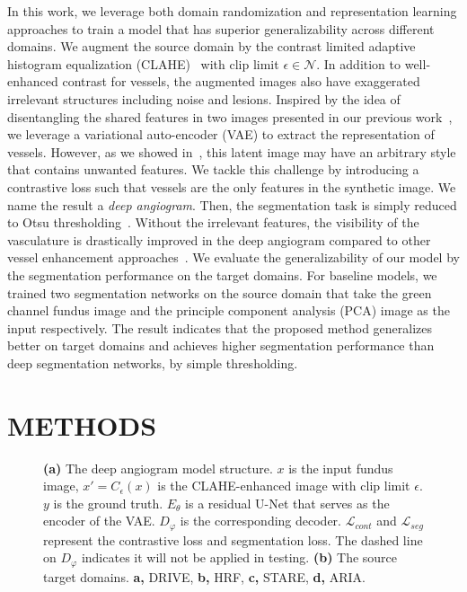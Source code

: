 \documentclass[]{spie}  %
\begin{document}
In this work, we leverage both domain randomization and representation learning approaches to train a model that has superior generalizability across different domains. We augment the source domain by the contrast limited adaptive histogram equalization (CLAHE)~\cite{reza2004realization} with clip limit $\epsilon\in \mathcal{N}$. In addition to well-enhanced contrast for vessels, the augmented images also have exaggerated irrelevant structures including noise and lesions. Inspired by the idea of disentangling the shared features in two images presented in our previous work~\cite{hu2021domain,hu2021life}, we leverage a variational auto-encoder (VAE) to extract the representation of vessels. However, as we showed in~\cite{hu2021domain}, this latent image may have an arbitrary style that contains unwanted features. We tackle this challenge by introducing a contrastive loss such that vessels are the only features in the synthetic image. We name the result a \textit{deep angiogram}. Then, the segmentation task is simply reduced to Otsu thresholding~\cite{otsu1979threshold}. Without the irrelevant features, the visibility of the vasculature is drastically improved in the deep angiogram compared to other vessel enhancement approaches~\cite{subramaniam2022vessel}. We evaluate the generalizability of our model by the segmentation performance on the target domains. For baseline models, we trained two segmentation networks on the source domain that take the green channel fundus image and the principle component analysis (PCA) image as the input respectively. The result indicates that the proposed method generalizes better on target domains and achieves higher segmentation performance than deep segmentation networks, by simple thresholding. 


\section{METHODS}

\begin{figure}[t]
    \centering
    \qquad
    \caption{{\bf (a)} The deep angiogram model structure. $x$ is the input fundus image, $x' = C_{\epsilon}(x)$ is the CLAHE-enhanced image with clip limit $\epsilon$. $y$ is the ground truth. $E_{\theta}$ is a residual U-Net that serves as the encoder of the VAE. $D_\varphi$ is the corresponding decoder. $\mathcal{L}_{cont}$ and $\mathcal{L}_{seg}$ represent the contrastive loss and segmentation loss. The dashed line on $D_\varphi$ indicates it will not be applied in testing. {\bf (b)} The source  target domains.  \textbf{a,} DRIVE, \textbf{b,} HRF, \textbf{c,} STARE, \textbf{d,} ARIA.}
    \label{fig:model}
\end{figure}
\end{document}
